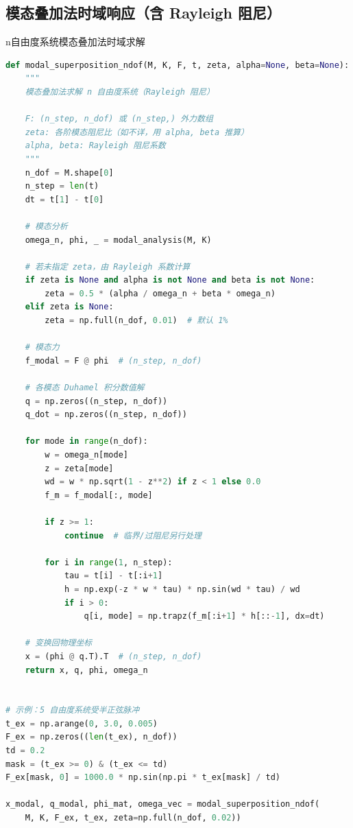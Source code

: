 \subsection{模态叠加法时域响应（含 Rayleigh 阻尼）}

\begin{mycode}{n自由度系统模态叠加法时域求解}
\begin{lstlisting}[language=Python]
def modal_superposition_ndof(M, K, F, t, zeta, alpha=None, beta=None):
    """
    模态叠加法求解 n 自由度系统（Rayleigh 阻尼）
    
    F: (n_step, n_dof) 或 (n_step,) 外力数组
    zeta: 各阶模态阻尼比（如不详，用 alpha, beta 推算）
    alpha, beta: Rayleigh 阻尼系数
    """
    n_dof = M.shape[0]
    n_step = len(t)
    dt = t[1] - t[0]
    
    # 模态分析
    omega_n, phi, _ = modal_analysis(M, K)
    
    # 若未指定 zeta，由 Rayleigh 系数计算
    if zeta is None and alpha is not None and beta is not None:
        zeta = 0.5 * (alpha / omega_n + beta * omega_n)
    elif zeta is None:
        zeta = np.full(n_dof, 0.01)  # 默认 1%
    
    # 模态力
    f_modal = F @ phi  # (n_step, n_dof)
    
    # 各模态 Duhamel 积分数值解
    q = np.zeros((n_step, n_dof))
    q_dot = np.zeros((n_step, n_dof))
    
    for mode in range(n_dof):
        w = omega_n[mode]
        z = zeta[mode]
        wd = w * np.sqrt(1 - z**2) if z < 1 else 0.0
        f_m = f_modal[:, mode]
        
        if z >= 1:
            continue  # 临界/过阻尼另行处理
        
        for i in range(1, n_step):
            tau = t[i] - t[:i+1]
            h = np.exp(-z * w * tau) * np.sin(wd * tau) / wd
            if i > 0:
                q[i, mode] = np.trapz(f_m[:i+1] * h[::-1], dx=dt)
    
    # 变换回物理坐标
    x = (phi @ q.T).T  # (n_step, n_dof)
    return x, q, phi, omega_n


# 示例：5 自由度系统受半正弦脉冲
t_ex = np.arange(0, 3.0, 0.005)
F_ex = np.zeros((len(t_ex), n_dof))
td = 0.2
mask = (t_ex >= 0) & (t_ex <= td)
F_ex[mask, 0] = 1000.0 * np.sin(np.pi * t_ex[mask] / td)

x_modal, q_modal, phi_mat, omega_vec = modal_superposition_ndof(
    M, K, F_ex, t_ex, zeta=np.full(n_dof, 0.02))
\end{lstlisting}
\end{mycode}

